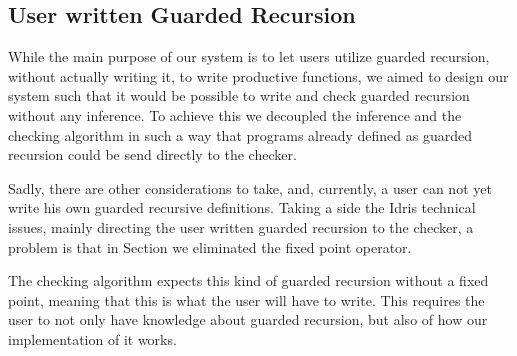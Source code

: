 \subsection{User written Guarded Recursion}
While the main purpose of our system is to let users utilize guarded recursion,
without actually writing it, to write productive functions, we aimed to design
our system such that it would be possible to write and check guarded
recursion without any inference. To achieve this we decoupled the inference and
the checking algorithm in such a way that programs already defined as guarded
recursion could be send directly to the checker. 

Sadly, there are other considerations to take, and, currently, a user can not
yet write his own guarded recursive definitions. Taking a side the Idris
technical issues, mainly directing the user written guarded recursion to the
checker, a problem is that in Section we eliminated the fixed
point operator.

The checking algorithm expects this kind of guarded recursion without a fixed
point, meaning that this is what the user will have to write. This requires the
user to not only have knowledge about guarded recursion, but also of how our
implementation of it works.


